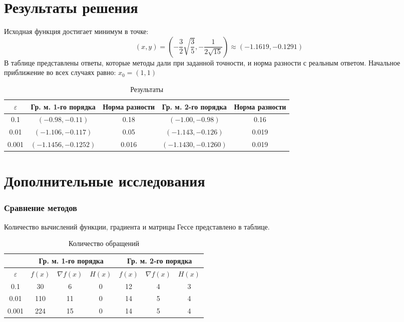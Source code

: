 \section{Результаты решения}
Исходная функция достигает минимум в точке:
\begin{equation}
(x, y) = (-\frac{3}{2}\sqrt{\frac{3}{5}}, -\frac{1}{2\sqrt{15}})\approx(-1.1619, -0.1291) 
\end{equation}
В таблице представлены ответы, которые методы дали при заданной точности, и норма разности с реальным ответом. Начальное приближение во всех случаях равно: $x_0=(1,1)$
\begin{table}[h]
	\centering
		\begin{tabular} {|c|c|c|c|c|}
			\hline
			$\varepsilon$ & Гр. м. 1-го порядка & Норма разности & Гр. м. 2-го порядка & Норма разности \\ \hline
			0.1 & $(-0.98,-0.11)$ & 0.18 & $(-1.00,-0.98)$ & 0.16\\ \hline
			0.01 & $(-1.106,-0.117)$ & 0.05 & $(-1.143,-0.126)$ & 0.019\\ \hline
			0.001 & $(-1.1456,-0.1252)$ & 0.016 & $(-1.1430,-0.1260)$ & 0.019\\ \hline
		\end{tabular}
		\caption{Результаты}
	\end{table}
	
\section{Дополнительные исследования}
\subsubsection{Сравнение методов}
Количество вычислений функции, градиента и матрицы Гессе представлено в таблице.
\begin{table}[h]
	\centering
		\begin{tabular} {|c|c|c|c|c|c|c|}
			\hline
			 & \multicolumn{3}{|c|}{Гр. м. 1-го порядка} & \multicolumn{3}{|c|}{Гр. м. 2-го порядка}\\
			\hline
			$\varepsilon$ & $f(x)$ & $\nabla f(x)$ &$H(x)$ & $f(x)$ & $\nabla f(x)$ &$H(x)$  \\ \hline
			0.1 & 30 &6 & 0 & 12 & 4 & 3\\ \hline
			0.01 & 110 &11 & 0 & 14 & 5 & 4\\ \hline
			0.001 & 224 & 15 & 0 & 14 & 5 & 4\\ \hline
		\end{tabular}
		\caption{Количество обращений}
	\end{table}


